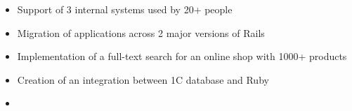 \documentclass[12pt,a4paper,ragged2e]{altacv}
\renewcommand{\cvsection}[2][]{%
    \bigskip%
    \ifstrequal{#1}{}{}{\marginpar{\vspace*{\dimexpr1pt-\baselineskip}\raggedright}}%
    {\color{heading}\bfseries\MakeUppercase{#2}}\\[-1ex]%
    {\color{heading}\rule{\linewidth}{2pt}\par}\medskip
  }
\begin{document}
\divider

\begin{itemize}
\item Support of 3 internal systems used by 20+ people
\item Migration of applications across 2 major versions of Rails
\end{itemize}

\divider

\begin{itemize}
\item Implementation of a full-text search for an online shop with 1000+ products
\item Creation of an integration between 1C database and Ruby
\item {}
\
\end{itemize}

\medskip



\begin{comment}
\clearpage
\cvsection[page2sidebar]{Publications}

\nocite{*}

\printbibliography[heading=pubtype,title={\printinfo{\faBook}{Books}},type=book]

\divider

\printbibliography[heading=pubtype,title={\printinfo{\faFileTextO}{Journal Articles}},type=article]

\divider

\printbibliography[heading=pubtype,title={\printinfo{\faGroup}{Conference Proceedings}},type=inproceedings]


\end{comment}
\end{document}
